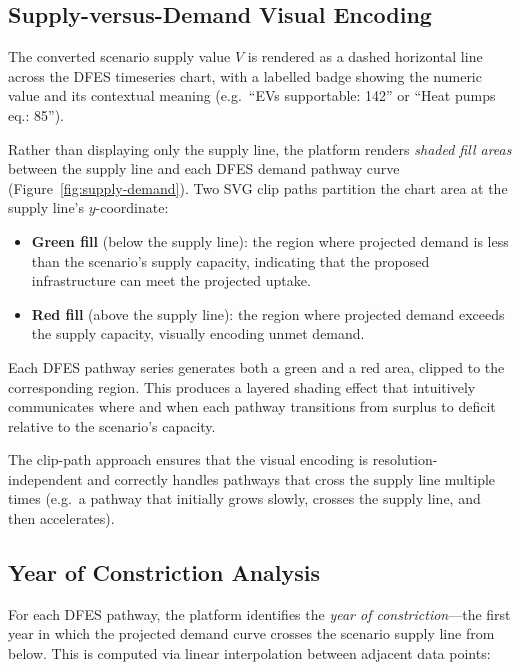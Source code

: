 \subsection{Supply-versus-Demand Visual Encoding}
\label{sec:supply-demand}

The converted scenario supply value $V$ is rendered as a dashed horizontal line across the DFES timeseries chart, with a labelled badge showing the numeric value and its contextual meaning (e.g.\ ``EVs supportable: 142'' or ``Heat pumps eq.: 85'').

Rather than displaying only the supply line, the platform renders \emph{shaded fill areas} between the supply line and each DFES demand pathway curve (Figure~\ref{fig:supply-demand}). Two SVG clip paths partition the chart area at the supply line's $y$-coordinate:

\begin{itemize}[nosep]
    \item \textbf{Green fill} (below the supply line): the region where projected demand is less than the scenario's supply capacity, indicating that the proposed infrastructure can meet the projected uptake.
    \item \textbf{Red fill} (above the supply line): the region where projected demand exceeds the supply capacity, visually encoding unmet demand.
\end{itemize}

\noindent Each DFES pathway series generates both a green and a red area, clipped to the corresponding region. This produces a layered shading effect that intuitively communicates where and when each pathway transitions from surplus to deficit relative to the scenario's capacity.

The clip-path approach ensures that the visual encoding is resolution-independent and correctly handles pathways that cross the supply line multiple times (e.g.\ a pathway that initially grows slowly, crosses the supply line, and then accelerates).

\subsection{Year of Constriction Analysis}
\label{sec:year-of-constriction}

For each DFES pathway, the platform identifies the \emph{year of constriction}---the first year in which the projected demand curve crosses the scenario supply line from below. This is computed via linear interpolation between adjacent data points:

